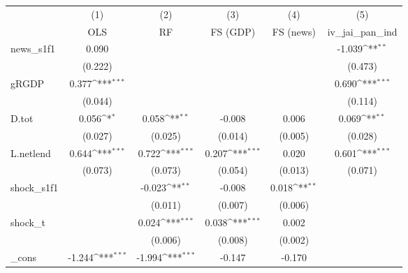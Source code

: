 {
\def\sym#1{\ifmmode^{#1}\else\(^{#1}\)\fi}
\begin{tabular}{l*{5}{c}}
\toprule
            &\multicolumn{1}{c}{(1)}&\multicolumn{1}{c}{(2)}&\multicolumn{1}{c}{(3)}&\multicolumn{1}{c}{(4)}&\multicolumn{1}{c}{(5)}\\
            &\multicolumn{1}{c}{OLS}&\multicolumn{1}{c}{RF}&\multicolumn{1}{c}{FS (GDP)}&\multicolumn{1}{c}{FS (news)}&\multicolumn{1}{c}{iv\_jai\_pan\_ind}\\
\midrule
news\_s1f1   &       0.090         &                     &                     &                     &      -1.039\sym{**} \\
            &     (0.222)         &                     &                     &                     &     (0.473)         \\
\addlinespace
gRGDP       &       0.377\sym{***}&                     &                     &                     &       0.690\sym{***}\\
            &     (0.044)         &                     &                     &                     &     (0.114)         \\
\addlinespace
D.tot       &       0.056\sym{*}  &       0.058\sym{**} &      -0.008         &       0.006         &       0.069\sym{**} \\
            &     (0.027)         &     (0.025)         &     (0.014)         &     (0.005)         &     (0.028)         \\
\addlinespace
L.netlend   &       0.644\sym{***}&       0.722\sym{***}&       0.207\sym{***}&       0.020         &       0.601\sym{***}\\
            &     (0.073)         &     (0.073)         &     (0.054)         &     (0.013)         &     (0.071)         \\
\addlinespace
shock\_s1f1  &                     &      -0.023\sym{**} &      -0.008         &       0.018\sym{**} &                     \\
            &                     &     (0.011)         &     (0.007)         &     (0.006)         &                     \\
\addlinespace
shock\_t     &                     &       0.024\sym{***}&       0.038\sym{***}&       0.002         &                     \\
            &                     &     (0.006)         &     (0.008)         &     (0.002)         &                     \\
\addlinespace
\_cons      &      -1.244\sym{***}&      -1.994\sym{***}&      -0.147         &      -0.170         &                     \\

\end{tabular}}
